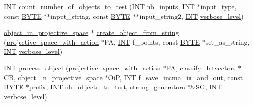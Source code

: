 \begin{DoxyCompactItemize}
\item 
\mbox{\hyperlink{galois_8h_a09fddde158a3a20bd2dcadb609de11dc}{I\+NT}} \mbox{\hyperlink{projective__space__main_8_c_a923a4bce2e1f307455c3d7333ea2e419}{count\+\_\+number\+\_\+of\+\_\+objects\+\_\+to\+\_\+test}} (\mbox{\hyperlink{galois_8h_a09fddde158a3a20bd2dcadb609de11dc}{I\+NT}} nb\+\_\+inputs, \mbox{\hyperlink{galois_8h_a09fddde158a3a20bd2dcadb609de11dc}{I\+NT}} $\ast$input\+\_\+type, const \mbox{\hyperlink{galois_8h_ab6cc7b4aeb6ea31aba2b3fbfc83ff5e6}{B\+Y\+TE}} $\ast$$\ast$input\+\_\+string, const \mbox{\hyperlink{galois_8h_ab6cc7b4aeb6ea31aba2b3fbfc83ff5e6}{B\+Y\+TE}} $\ast$$\ast$input\+\_\+string2, \mbox{\hyperlink{galois_8h_a09fddde158a3a20bd2dcadb609de11dc}{I\+NT}} \mbox{\hyperlink{simeon_8_c_a818073fbcc2f439e7c56952f67386122}{verbose\+\_\+level}})
\item 
\mbox{\hyperlink{classobject__in__projective__space}{object\+\_\+in\+\_\+projective\+\_\+space}} $\ast$ \mbox{\hyperlink{projective__space__main_8_c_a8f63b5bf071061de5cbb1e4d00d0518b}{create\+\_\+object\+\_\+from\+\_\+string}} (\mbox{\hyperlink{classprojective__space__with__action}{projective\+\_\+space\+\_\+with\+\_\+action}} $\ast$PA, \mbox{\hyperlink{galois_8h_a09fddde158a3a20bd2dcadb609de11dc}{I\+NT}} f\+\_\+points, const \mbox{\hyperlink{galois_8h_ab6cc7b4aeb6ea31aba2b3fbfc83ff5e6}{B\+Y\+TE}} $\ast$set\+\_\+as\+\_\+string, \mbox{\hyperlink{galois_8h_a09fddde158a3a20bd2dcadb609de11dc}{I\+NT}} \mbox{\hyperlink{simeon_8_c_a818073fbcc2f439e7c56952f67386122}{verbose\+\_\+level}})
\item 
\mbox{\hyperlink{galois_8h_a09fddde158a3a20bd2dcadb609de11dc}{I\+NT}} \mbox{\hyperlink{projective__space__main_8_c_a63a6b06bd2a9a9c50ed710271f4d5530}{process\+\_\+object}} (\mbox{\hyperlink{classprojective__space__with__action}{projective\+\_\+space\+\_\+with\+\_\+action}} $\ast$PA, \mbox{\hyperlink{classclassify__bitvectors}{classify\+\_\+bitvectors}} $\ast$CB, \mbox{\hyperlink{classobject__in__projective__space}{object\+\_\+in\+\_\+projective\+\_\+space}} $\ast$OiP, \mbox{\hyperlink{galois_8h_a09fddde158a3a20bd2dcadb609de11dc}{I\+NT}} f\+\_\+save\+\_\+incma\+\_\+in\+\_\+and\+\_\+out, const \mbox{\hyperlink{galois_8h_ab6cc7b4aeb6ea31aba2b3fbfc83ff5e6}{B\+Y\+TE}} $\ast$prefix, \mbox{\hyperlink{galois_8h_a09fddde158a3a20bd2dcadb609de11dc}{I\+NT}} nb\+\_\+objects\+\_\+to\+\_\+test, \mbox{\hyperlink{classstrong__generators}{strong\+\_\+generators}} $\ast$\&SG, \mbox{\hyperlink{galois_8h_a09fddde158a3a20bd2dcadb609de11dc}{I\+NT}} \mbox{\hyperlink{simeon_8_c_a818073fbcc2f439e7c56952f67386122}{verbose\+\_\+level}})

\end{DoxyCompactItemize}
